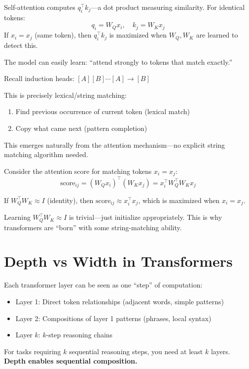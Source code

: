 \begin{remark}
    Self-attention computes $q_i^\top k_j$---a dot product measuring similarity. For identical tokens:
    \[
        q_i = W_Q x_i, \quad k_j = W_K x_j
    \]
    If $x_i = x_j$ (same token), then $q_i^\top k_j$ is maximized when $W_Q, W_K$ are learned to detect this.

    The model can easily learn: ``attend strongly to tokens that match exactly.''
\end{remark}

\begin{remark}
    Recall induction heads: $[A][B] \cdots [A] \to [B]$

    This is precisely lexical/string matching:
    \begin{enumerate}
        \item Find previous occurrence of current token (lexical match)
        \item Copy what came next (pattern completion)
    \end{enumerate}

    This emerges naturally from the attention mechanism---no explicit string matching algorithm needed.
\end{remark}

\begin{remark}
    Consider the attention score for matching tokens $x_i = x_j$:
    \[
        \text{score}_{ij} = (W_Q x_i)^\top (W_K x_j) = x_i^\top W_Q^\top W_K x_j
    \]

    If $W_Q^\top W_K \approx I$ (identity), then $\text{score}_{ij} \approx x_i^\top x_j$, which is maximized when $x_i = x_j$.

    Learning $W_Q^\top W_K \approx I$ is trivial---just initialize appropriately. This is why transformers are ``born'' with some string-matching ability.
\end{remark}

\section{Depth vs Width in Transformers}

\begin{remark}
    Each transformer layer can be seen as one ``step'' of computation:
    \begin{itemize}
        \item Layer 1: Direct token relationships (adjacent words, simple patterns)
        \item Layer 2: Compositions of layer 1 patterns (phrases, local syntax)
        \item Layer $k$: $k$-step reasoning chains
    \end{itemize}

    For tasks requiring $k$ sequential reasoning steps, you need at least $k$ layers. \textbf{Depth enables sequential composition.}
\end{remark}

